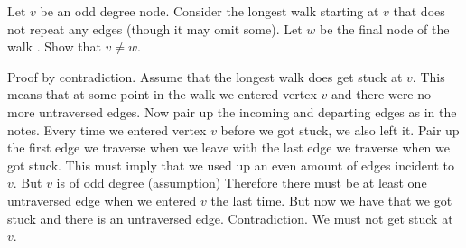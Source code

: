 \question Let $v$ be an odd degree node. Consider the longest walk 
starting at $v$ that does not repeat any edges (though it may omit 
some). Let $w$ be the final node of the walk . Show that $v \neq w$.
\begin{solution}[3 in]
Proof by contradiction.
Assume that the longest walk does get stuck at $v$. 
This means that at some point in the walk we entered vertex $v$ and 
there were no more untraversed edges.
Now pair up the incoming and departing edges as in the notes.
Every time we entered vertex $v$ before we got stuck, we also left it.
Pair up the first edge we traverse when we leave with the last edge 
we traverse when we got stuck.
This must imply that we used up an even amount of edges incident to 
$v$.
But $v$ is of odd degree (assumption)
Therefore there must be at least one untraversed edge when we entered 
$v$ the last time.
But now we have that we got stuck and there is an untraversed edge. 
Contradiction. We must not get stuck at $v$.
\end{solution}
